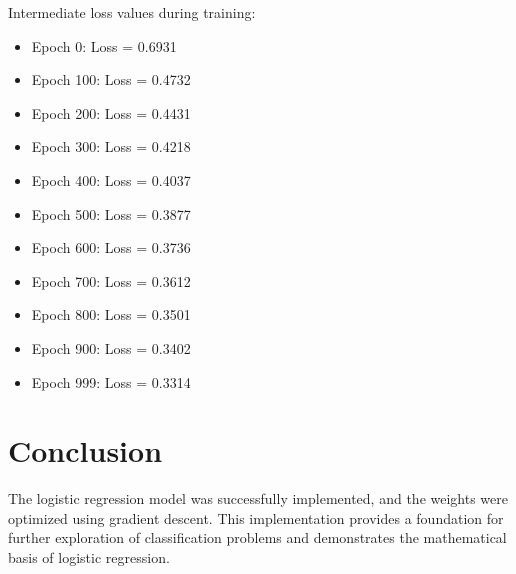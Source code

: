\documentclass[a4paper,12pt]{article}
\begin{document}
Intermediate loss values during training:
\begin{itemize}
    \item Epoch 0: Loss = {0.6931}
    \item Epoch 100: Loss = {0.4732}
    \item Epoch 200: Loss = {0.4431}
    \item Epoch 300: Loss = {0.4218}
    \item Epoch 400: Loss = {0.4037}
    \item Epoch 500: Loss = {0.3877}
    \item Epoch 600: Loss = {0.3736}
    \item Epoch 700: Loss = {0.3612}
    \item Epoch 800: Loss = {0.3501}
    \item Epoch 900: Loss = {0.3402}
    \item Epoch 999: Loss = {0.3314}
\end{itemize}


\section*{Conclusion}
The logistic regression model was successfully implemented, and the weights were optimized using gradient descent. This implementation provides a foundation for further exploration of classification problems and demonstrates the mathematical basis of logistic regression.
\end{document}
